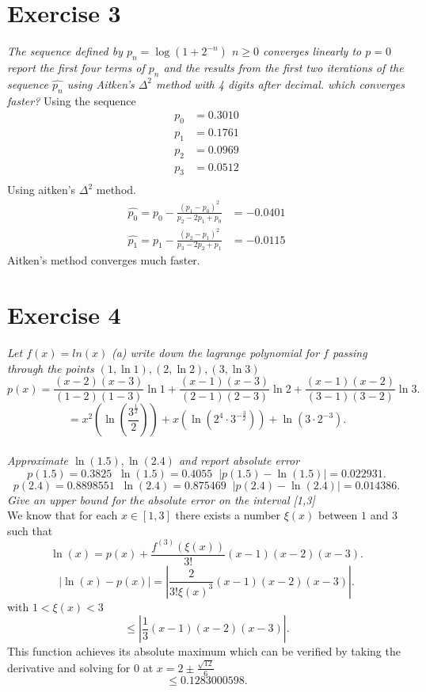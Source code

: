 \documentclass{amsart}
\begin{document}
    \section{Exercise 3}
    \emph{
    The sequence defined by $p_n = \log(1+2^{-n})$ $n \ge 0$ converges linearly to $p = 0$
    report the first four terms of $p_n$ and the results from the first two iterations of the sequence $\hat{p_n}$ 
    using Aitken's $\Delta^2$ method with 4 digits after decimal. which converges faster?
    }
    Using the sequence
    \begin{align*}
        p_0 &= 0.3010\\
        p_1 &= 0.1761\\
        p_2 &= 0.0969\\
        p_3 &= 0.0512\\
    \end{align*}
    Using aitken's $\Delta^2 $ method.
    \begin{align*}
        \hat{p_0} = p_0 - \frac{(p_1-p_0)^2}{p_2-2p_1+p_0} &= -0.0401\\
        \hat{p_1} = p_1 - \frac{(p_2-p_1)^2}{p_3-2p_2+p_1} &= -0.0115
    \end{align*}
    Aitken's method converges much faster.

    \section{Exercise 4}
    \emph{
        Let $f(x) = ln(x)$
    }
    \emph{
        (a) write down the lagrange polynomial for $f$ passing through the points
        $(1,\ln 1), (2, \ln 2), (3, \ln 3)$\\
    }
    \[
        p(x) = \frac{(x-2)(x-3)}{(1-2)(1-3)}\ln 1 + \frac{(x-1)(x-3)}{(2-1)(2-3)}\ln 2 + \frac{(x-1)(x-2)}{(3-1)(3-2)}\ln 3
    .\] 
    \[
     = x^{2}\left(\ln\left(\frac{3^{\frac{1}{2}}}{2}\right)\right)+x\left(\ln\left(2^{4}\cdot3^{-\frac{3}{2}}\right)\right)+\ln\left(3\cdot2^{-3}\right)
    .\] \\
    \emph{
        Approximate $\ln(1.5), \ln(2.4)$ and report absolute error
    }
    \[
    p(1.5) = 0.3825 \;\; \ln(1.5) = 0.4055 \;\; |p(1.5) - \ln(1.5)| = 0.022931
    .\] 
    \[
    p(2.4) = 0.8898551 \;\; \ln(2.4) = 0.875469 \;\; |p(2.4)-\ln(2.4)| = 0.014386
    .\] 
    \emph{Give an upper bound for the absolute error on the interval [1,3]}\\
    We know that for each $x \in [1,3]$ there exists a number $\xi(x)$ between $1$ and $3$
    such that 
    \[
    \ln(x) = p(x) + \frac{f^{(3)}(\xi(x))}{3!}(x-1)(x-2)(x-3)  
    .\] 
    \[
        |\ln(x) - p(x)| = |\frac{2}{3!\xi(x)^{3}}(x-1)(x-2)(x-3)|
    .\] 
    with $1 < \xi(x) < 3$
    \[
    \le |\frac{1}{3}(x-1)(x-2)(x-3)|
    .\] 
    This function achieves its absolute maximum which can be verified by taking the derivative and solving for 0 at $x = 2 \pm \frac{\sqrt{12}}{6}$
    \[
    \le 0.1283000598
    .\] 
\end{document}
